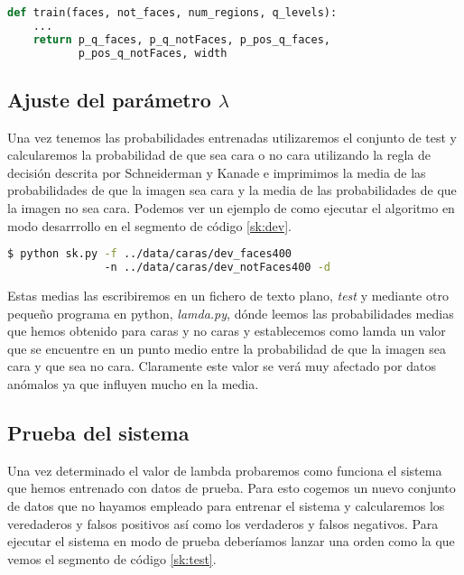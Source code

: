 \begin{lstlisting}[language=python,label=roc:rocdata,caption=EDA con la que gestionar la curva ROC]
def train(faces, not_faces, num_regions, q_levels):
	...
    return p_q_faces, p_q_notFaces, p_pos_q_faces, 
    	   p_pos_q_notFaces, width
\end{lstlisting}


\subsection{Ajuste del parámetro $\lambda$}

Una vez tenemos las probabilidades entrenadas utilizaremos el conjunto de test y calcularemos la probabilidad de que sea cara o no cara utilizando la regla de decisión descrita por Schneiderman y Kanade e imprimimos la media de las probabilidades de que la imagen sea cara y la media de las probabilidades de que la imagen no sea cara. Podemos ver un ejemplo de como ejecutar el algoritmo en modo desarrrollo en el segmento de código \ref{sk:dev}.\par

\begin{lstlisting}[language=bash,label=sk:dev,caption=Ejecución en modo desarrollo]
$ python sk.py -f ../data/caras/dev_faces400 
               -n ../data/caras/dev_notFaces400 -d 
\end{lstlisting}

Estas medias las escribiremos en un fichero de texto plano, \textit{test} y mediante otro pequeño programa en python, \textit{lamda.py}, dónde leemos las probabilidades medias que hemos obtenido para caras y no caras y establecemos como lamda un valor que se encuentre en un punto medio entre la probabilidad de que  la imagen sea cara y que sea no cara. Claramente este valor se verá muy afectado por datos anómalos ya que influyen mucho en la media.\par

\subsection{Prueba del sistema}

Una vez determinado el valor de lambda probaremos como funciona el sistema que hemos entrenado con datos de prueba. Para esto cogemos un nuevo conjunto de datos que no hayamos empleado para entrenar el sistema y calcularemos los veredaderos y falsos positivos así como los verdaderos y falsos negativos. Para ejecutar el sistema en modo de prueba deberíamos lanzar una orden como la que vemos el segmento de código \ref{sk:test}.

